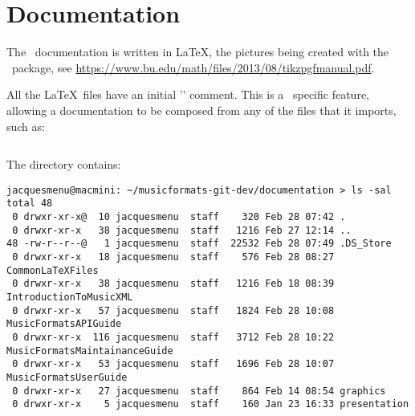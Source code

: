 
\chapter{Documentation}

The \mf\ documentation is written in \LaTeX, the pictures being created with the \tikzpgf\ package, see \url{https://www.bu.edu/math/files/2013/08/tikzpgfmanual.pdf}.

All the \LaTeX\ files have an initial '' comment. This is a \texshop\ specific feature, allowing a documentation to be composed from any of the files that it imports, such as:
\begin{lstlisting}[language=Latex]
% !TEX root = MusicFormatsMaintainanceGuide.tex
\end{lstlisting}

The  directory contains:
\begin{lstlisting}[language=Terminal]
jacquesmenu@macmini: ~/musicformats-git-dev/documentation > ls -sal
total 48
 0 drwxr-xr-x@  10 jacquesmenu  staff    320 Feb 28 07:42 .
 0 drwxr-xr-x   38 jacquesmenu  staff   1216 Feb 27 12:14 ..
48 -rw-r--r--@   1 jacquesmenu  staff  22532 Feb 28 07:49 .DS_Store
 0 drwxr-xr-x   18 jacquesmenu  staff    576 Feb 28 08:27 CommonLaTeXFiles
 0 drwxr-xr-x   38 jacquesmenu  staff   1216 Feb 18 08:39 IntroductionToMusicXML
 0 drwxr-xr-x   57 jacquesmenu  staff   1824 Feb 28 10:08 MusicFormatsAPIGuide
 0 drwxr-xr-x  116 jacquesmenu  staff   3712 Feb 28 10:22 MusicFormatsMaintainanceGuide
 0 drwxr-xr-x   53 jacquesmenu  staff   1696 Feb 28 10:07 MusicFormatsUserGuide
 0 drwxr-xr-x   27 jacquesmenu  staff    864 Feb 14 08:54 graphics
 0 drwxr-xr-x    5 jacquesmenu  staff    160 Jan 23 16:33 presentation
\end{lstlisting}

